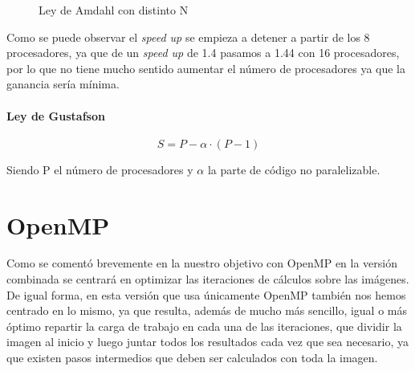 \documentclass[12pt]{report} %
\begin{document}
\begin{figure}[H]
    \caption{Ley de Amdahl con distinto N}
    \label{fig:fig_amdahl}
\end{figure}

Como se puede observar el \textit{speed up} se empieza a detener a partir de los 8 procesadores, ya que de un \textit{speed up} de 1.4 pasamos a 1.44 con 16 procesadores, por lo que no tiene mucho sentido aumentar el número de procesadores ya que la ganancia sería mínima.

\subsubsection{Ley de Gustafson}
\label{sec:Gustafson}

\[ S = P - \alpha \cdot (P - 1)\]

Siendo P el número de procesadores y $\alpha$ la parte de código no paralelizable.


\chapter{OpenMP}
\label{chap:OpenMP}

Como se comentó brevemente en la  nuestro objetivo con OpenMP en la versión combinada se centrará en optimizar las iteraciones de cálculos sobre las imágenes. De igual forma, en esta versión que usa únicamente OpenMP también nos hemos centrado en lo mismo, ya que resulta, además de mucho más sencillo, igual o más óptimo repartir la carga de trabajo en cada una de las iteraciones, que dividir la imagen al inicio y luego juntar todos los resultados cada vez que sea necesario, ya que existen pasos intermedios que deben ser calculados con toda la imagen.
\end{document}
